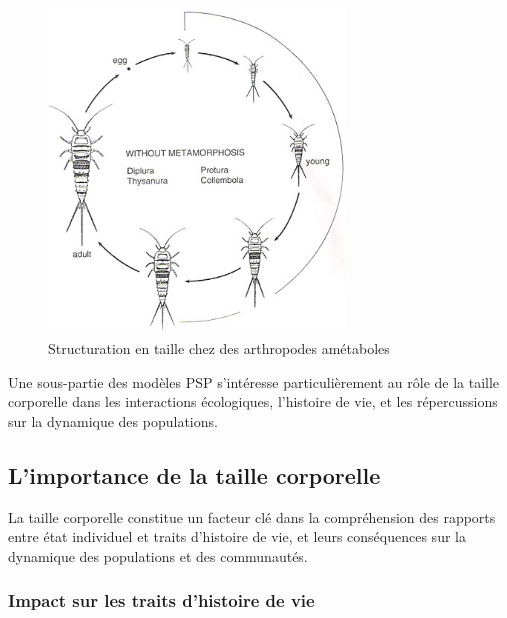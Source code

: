 \begin{figure}[!ht]
\centering
\includegraphics[width=0.7\textwidth]{1_CorpsDeThese/EA/Fig/bugs1}
\caption[Structuration en taille chez des
arthropodes amétaboles]{Structuration en taille chez des arthropodes amétaboles}\label{fig:taille}
\end{figure}

Une sous-partie des modèles PSP s'intéresse particulièrement au rôle de la
taille corporelle dans les interactions écologiques, l'histoire de vie, et les
répercussions sur la dynamique des populations. 

\subsection{L'importance de la taille corporelle}

La taille corporelle constitue un facteur clé dans la compréhension des rapports
entre état individuel et traits d'histoire de vie, et leurs conséquences sur la
dynamique des populations et des communautés. 

\subsubsection{Impact sur les traits d'histoire de vie}

